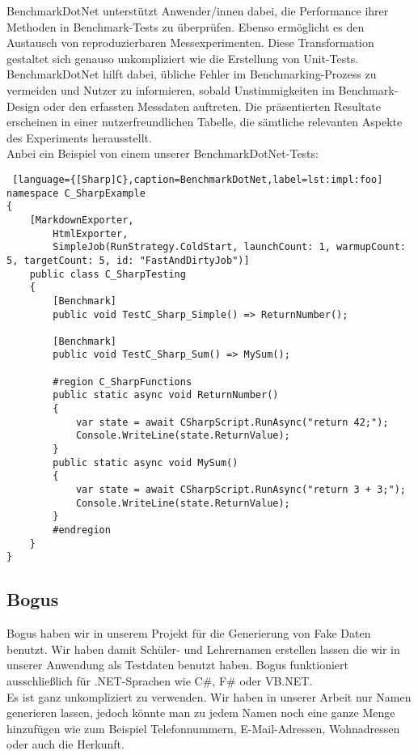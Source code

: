BenchmarkDotNet unterstützt Anwender/innen dabei, die Performance ihrer Methoden in 
Benchmark-Tests zu überprüfen. Ebenso ermöglicht es den Austausch von reproduzierbaren 
Messexperimenten. Diese Transformation gestaltet sich genauso unkompliziert wie die 
Erstellung von Unit-Tests. BenchmarkDotNet hilft dabei, übliche Fehler im Benchmarking-Prozess 
zu vermeiden und Nutzer zu informieren, sobald Unstimmigkeiten im Benchmark-Design oder den 
erfassten Messdaten auftreten. Die präsentierten Resultate erscheinen in einer 
nutzerfreundlichen Tabelle, die sämtliche relevanten Aspekte des Experiments herausstellt.\\
Anbei ein Beispiel von einem unserer BenchmarkDotNet-Tests:\\

\begin{lstlisting} [language={[Sharp]C},caption=BenchmarkDotNet,label=lst:impl:foo]
namespace C_SharpExample
{
    [MarkdownExporter,
        HtmlExporter,
        SimpleJob(RunStrategy.ColdStart, launchCount: 1, warmupCount: 5, targetCount: 5, id: "FastAndDirtyJob")]
    public class C_SharpTesting
    {
        [Benchmark]
        public void TestC_Sharp_Simple() => ReturnNumber();

        [Benchmark]
        public void TestC_Sharp_Sum() => MySum();

        #region C_SharpFunctions
        public static async void ReturnNumber()
        {
            var state = await CSharpScript.RunAsync("return 42;");
            Console.WriteLine(state.ReturnValue);
        }
        public static async void MySum()
        {
            var state = await CSharpScript.RunAsync("return 3 + 3;");
            Console.WriteLine(state.ReturnValue);
        }
        #endregion
    }
}
\end{lstlisting}

\newpage
\subsection*{Bogus}

Bogus haben wir in unserem Projekt für die Generierung von Fake Daten benutzt. 
Wir haben damit Schüler- und Lehrernamen erstellen lassen die wir in unserer Anwendung als 
Testdaten benutzt haben. Bogus funktioniert ausschließlich für 
.NET-Sprachen wie C\#, F\# oder VB.NET. \\

Es ist ganz unkompliziert zu verwenden. Wir haben in unserer Arbeit nur Namen generieren lassen, 
jedoch könnte man zu jedem Namen noch eine ganze Menge hinzufügen wie zum Beispiel 
Telefonnummern, E-Mail-Adressen, Wohnadressen oder auch die Herkunft.\\

